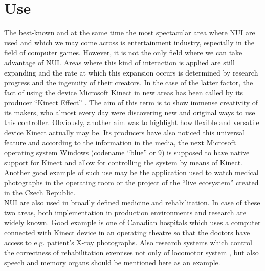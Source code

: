 \documentclass{jacsart}
\begin{document}
\section{Use} \label{sec:use}
\indent The best-known and at the same time the most spectacular area where NUI are used and which we may come across is entertainment industry, especially in the field of computer games. However, it is not the only field where we can take advantage of NUI. Areas where this kind of interaction is applied are still expanding and the rate at which this expansion occurs is determined by research progress and the ingenuity of their creators. In the case of the latter factor, the fact of using the device Microsoft Kinect in new areas has been called by its producer “Kinect Effect” \cite{kinectEffect}. The aim of this term is to show immense creativity of its makers, who almost every day were discovering new and original ways to use this controller. Obviously, another aim was to highlight how flexible and versatile device Kinect actually may be. Its producers have also noticed this universal feature and according to the information in the media, the next Microsoft operating system Windows (codename “blue” or 9) is supposed to have native support for Kinect and allow for controlling the system by means of Kinect. Another good example of such use may be the application used to watch medical photographs in the operating room or the project of the “live ecosystem” created in the Czech Republic.\\
\indent NUI are also used in broadly defined medicine and rehabilitation. In case of these two areas, both implementation in production environments and research are widely known. Good example is one of Canadian hospitals which uses a computer connected with Kinect device in an operating theatre so that the doctors have access to e.g. patient’s X-ray photographs. Also research systems which control the correctness of rehabilitation exercises not only of locomotor system \cite{Chang2011}, but also speech and memory organs \cite{Rego2011} should be mentioned here as an example.\\
\end{document}
